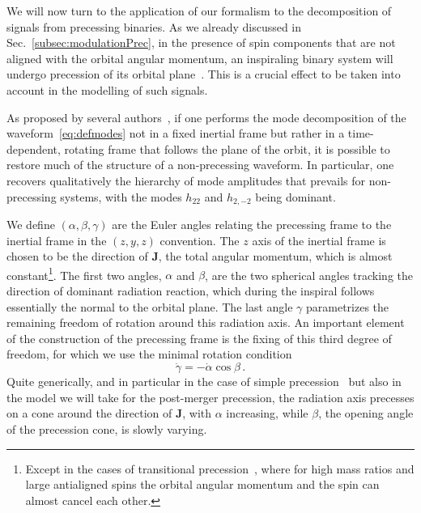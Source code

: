 \documentclass[aps,showpacs,twocolumn,
prd,superscriptaddress,nofootinbib]{revtex4-1}
\newcommand{\be}{\begin{equation}}
\newcommand{\ee}{\end{equation}}
\begin{document}
We will now turn to the application of our formalism to the decomposition of signals from precessing binaries. As we already discussed in Sec.~\ref{subsec:modulationPrec}, in the presence of spin components that are not aligned with the orbital angular momentum, an inspiraling binary system will undergo precession of its orbital plane~\cite{Apostolatos+94, Kidder95}. This is a crucial effect to be taken into account in the modelling of such signals.

As proposed by several authors~\cite{BCV03b, BCPTV05, Schmidt+10, OShaughnessy+11, Boyle+11}, if one performs the mode decomposition of the waveform~\eqref{eq:defmodes} not in a fixed inertial frame but rather in a time-dependent, rotating frame that follows the plane of the orbit, it is possible to restore much of the structure of a non-precessing waveform. In particular, one recovers qualitatively the hierarchy of mode amplitudes that prevails for non-precessing systems, with the modes $h_{22}$ and $h_{2,-2}$ being dominant.

We define $(\alpha, \beta, \gamma)$ are the Euler angles relating the precessing frame to the inertial frame in the $(z,y,z)$ convention. The $z$ axis of the inertial frame is chosen to be the direction of $\bm{J}$, the total angular momentum, which is almost constant\footnote{Except in the cases of transitional precession~\cite{Apostolatos+94}, where for high mass ratios and large antialigned spins the orbital angular momentum and the spin can almost cancel each other.}. The first two angles, $\alpha$ and $\beta$, are the two spherical angles tracking the direction of dominant radiation reaction, which during the inspiral follows essentially the normal to the orbital plane. The last angle $\gamma$ parametrizes the remaining freedom of rotation around this radiation axis. An important element of the construction of the precessing frame is the fixing of this third degree of freedom, for which we use the minimal rotation condition~\cite{Boyle+11}
\be\label{eq:gammadot}
	\dot{\gamma} = -\dot{\alpha}\cos \beta \,.
\ee
Quite generically, and in particular in the case of simple precession~\cite{Apostolatos+94, Kidder95} but also in the model we will take for the post-merger precession, the radiation axis precesses on a cone around the direction of $\bm{J}$, with $\alpha$ increasing, while $\beta$, the opening angle of the precession cone, is slowly varying.
\end{document}
